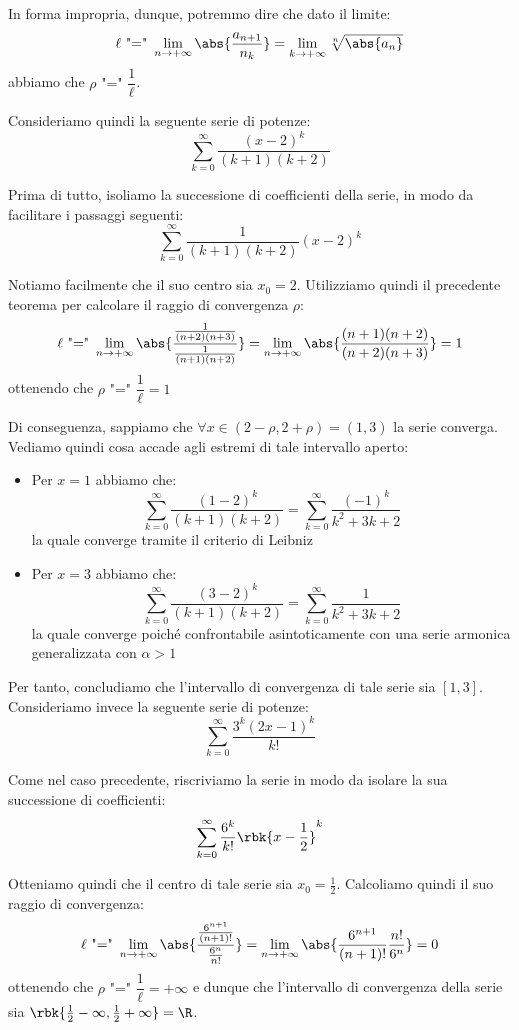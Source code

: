 \documentclass[a4paper, 12pt]{report}
\begin{document}
    In forma impropria, dunque, potremmo dire che dato il limite:
    \[\ell \text{ "=" }\lim_{n \to +\infty} \abs{\frac{a_{n+1}}{n_k}} = \lim_{k \to +\infty} \sqrt[n]{\abs{a_n}}\]
    abbiamo che $\rho \text{ "=" } \dfrac{1}{\ell}$.

    Consideriamo quindi la seguente serie di potenze:
    \[\sum_{k=0}^{\infty} \frac{(x-2)^k}{(k+1)(k+2)}\]

    Prima di tutto, isoliamo la successione di coefficienti della serie, in modo da facilitare i passaggi seguenti:
    \[\sum_{k=0}^{\infty} \frac{1}{(k+1)(k+2)} (x-2)^k\]

    Notiamo facilmente che il suo centro sia $x_0 = 2$. Utilizziamo quindi il precedente teorema per calcolare il raggio di convergenza $\rho$:
    \[\ell \text{ "=" } \lim_{n \to +\infty} \abs{\frac{\frac{1}{(n+2)(n+3)}}{\frac{1}{(n+1)(n+2)}}} = \lim_{n \to +\infty} \abs{\frac{(n+1)(n+2)}{(n+2)(n+3)}} = 1\]
    ottenendo che $\rho \text{ "=" } \dfrac{1}{\ell} = 1$

    Di conseguenza, sappiamo che $\forall x \in (2 - \rho, 2 + \rho) = (1,3)$ la serie converga. Vediamo quindi cosa accade agli estremi di tale intervallo aperto:
    \begin{itemize}
        \item Per $x = 1$ abbiamo che:
        \[\sum_{k=0}^{\infty} \frac{(1-2)^k }{(k+1)(k+2)}= \sum_{k=0}^{\infty} \frac{(-1)^k}{k^2 + 3k + 2}\]
        la quale converge tramite il criterio di Leibniz

        \item Per $x = 3$ abbiamo che:
        \[\sum_{k=0}^{\infty} \frac{(3-2)^k }{(k+1)(k+2)}= \sum_{k=0}^{\infty} \frac{1}{k^2 + 3k + 2}\]
        la quale converge poiché confrontabile asintoticamente con una serie armonica generalizzata con $\alpha > 1$
    \end{itemize}

    Per tanto, concludiamo che l'intervallo di convergenza di tale serie sia $[1, 3]$. Consideriamo invece la seguente serie di potenze:
    \[ \sum_{k=0}^{\infty} \frac{3^k(2x-1)^k}{k!} \]

    Come nel caso precedente, riscriviamo la serie in modo da isolare la sua successione di coefficienti:
    \[ \sum_{k=0}^{\infty} \frac{6^k}{k!}\rbk{x-\frac{1}{2}}^k\]

    Otteniamo quindi che il centro di tale serie sia $x_0 = \frac{1}{2}$. Calcoliamo quindi il suo raggio di convergenza:
    \[\ell \text{ "=" } \lim_{n \to +\infty} \abs{\frac{\frac{6^{n+1}}{(n+1)!}}{\frac{6^n}{n!}}} = \lim_{n \to +\infty} \abs{\frac{6^{n+1}}{(n+1)!}\frac{n!}{6^n}} = 0\]
    ottenendo che $\rho \text{ "=" } \dfrac{1}{\ell} = +\infty$ e dunque che l'intervallo di convergenza della serie sia $\rbk{\frac{1}{2} - \infty, \frac{1}{2} + \infty} = \R$.
\end{document}
